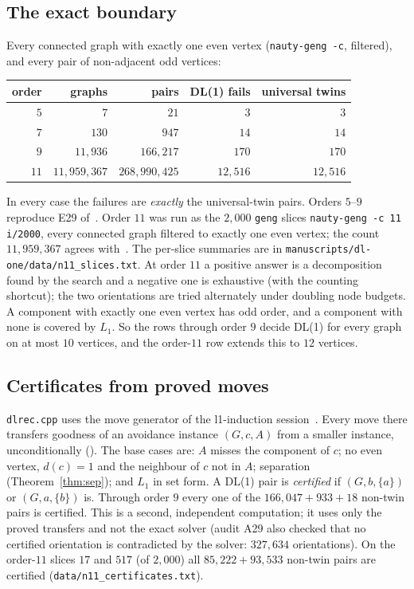 \documentclass[11pt]{amsart}
\theoremstyle{definition}
\begin{document}
\subsection*{The exact boundary}
Every connected graph with exactly one even vertex (\texttt{nauty-geng -c}, filtered), and every pair
of non-adjacent odd vertices:

\begin{center}
\begin{tabular}{rrrrr}
\toprule
order & graphs & pairs & DL(1) fails & universal twins\\
\midrule
$5$ & $7$ & $21$ & $3$ & $3$\\
$7$ & $130$ & $947$ & $14$ & $14$\\
$9$ & $11{,}936$ & $166{,}217$ & $170$ & $170$\\
$11$ & $11{,}959{,}367$ & $268{,}990{,}425$ & $12{,}516$ & $12{,}516$\\
\bottomrule
\end{tabular}
\end{center}

In every case the failures are \emph{exactly} the universal-twin pairs. Orders $5$--$9$ reproduce
E29 of~\cite{DT}. Order $11$ was run as the $2{,}000$ \texttt{geng} slices
\texttt{nauty-geng -c 11 i/2000}, every connected graph filtered to exactly one even vertex; the
count $11{,}959{,}367$ agrees with~\cite{L1S}. The per-slice summaries are in
\texttt{manuscripts/dl-one/data/n11\_slices.txt}. At order $11$ a positive answer is a decomposition
found by the search and a negative one is exhaustive (with the counting shortcut); the two
orientations are tried alternately under doubling node budgets. A component with exactly one even vertex has odd order, and a component with none
is covered by $L_1$. So the rows through order $9$ decide DL(1) for every graph on at most $10$
vertices, and the order-$11$ row extends this to $12$ vertices.

\subsection*{Certificates from proved moves}
\texttt{dlrec.cpp} uses the move generator of the l1-induction session~\cite[\S3]{L1I}. Every move
there transfers goodness of an avoidance instance $(G,c,A)$ from a smaller instance, unconditionally
(\cite[Theorem~3.1]{L1I}). The base cases are: $A$ misses the component of $c$; no even vertex,
$d(c)=1$ and the neighbour of $c$ not in $A$; separation (Theorem~\ref{thm:sep}); and $L_1$ in set
form. A DL(1) pair is
\emph{certified} if $(G,b,\{a\})$ or $(G,a,\{b\})$ is. Through order $9$ every one of the
$166{,}047+933+18$ non-twin pairs is certified. This is a second, independent computation; it uses
only the proved transfers and not the exact solver (audit A29 also checked that no certified
orientation is contradicted by the solver: $327{,}634$ orientations). On the order-$11$ slices $17$
and $517$ (of $2{,}000$) all $85{,}222+93{,}533$ non-twin pairs are certified
(\texttt{data/n11\_certificates.txt}).
\end{document}
